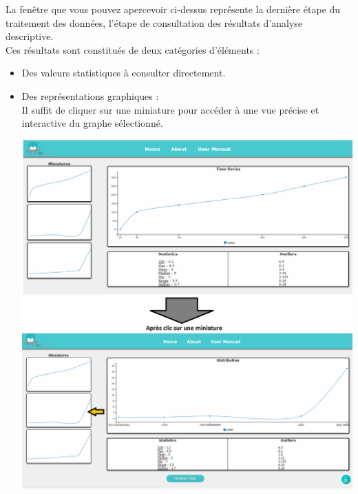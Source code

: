 		La fenêtre que vous pouvez apercevoir ci-dessus représente la dernière étape du traitement des données, l'étape de consultation des résultats d'analyse descriptive.\\
		Ces résultats sont constitués de deux catégories d'éléments :
		\begin{itemize}
			\item Des valeurs statistiques à consulter directement.
			\item Des représentations graphiques :\\
				Il suffit de cliquer sur une miniature pour accéder à une vue précise et interactive du graphe sélectionné.\\
			\begin{center}\includegraphics[scale=0.40]{fenetre3-2.png}\end{center}		
		\end{itemize}
		
